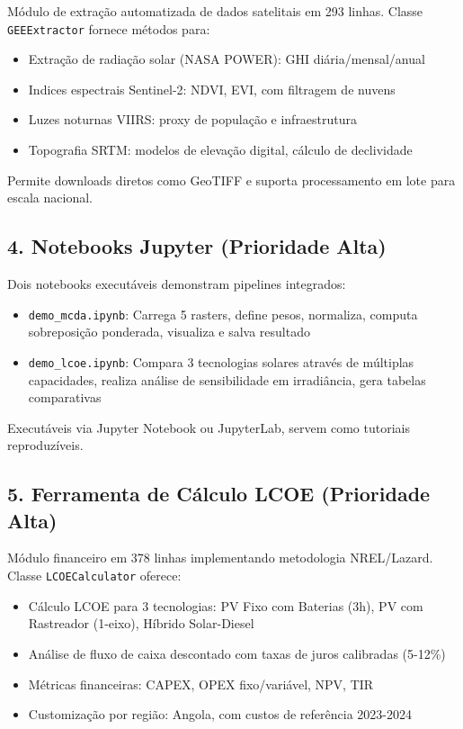 \documentclass[12pt, a4paper]{article}
\begin{document}
Módulo de extração automatizada de dados satelitais em 293 linhas. Classe \texttt{GEEExtractor} fornece métodos para:

\begin{itemize}
    \item Extração de radiação solar (NASA POWER): GHI diária/mensal/anual
    \item Indices espectrais Sentinel-2: NDVI, EVI, com filtragem de nuvens
    \item Luzes noturnas VIIRS: proxy de população e infraestrutura
    \item Topografia SRTM: modelos de elevação digital, cálculo de declividade
\end{itemize}

Permite downloads diretos como GeoTIFF e suporta processamento em lote para escala nacional.

\subsection{4. Notebooks Jupyter (Prioridade Alta)}

Dois notebooks executáveis demonstram pipelines integrados:

\begin{itemize}
    \item \texttt{demo\_mcda.ipynb}: Carrega 5 rasters, define pesos, normaliza, computa sobreposição ponderada, visualiza e salva resultado
    \item \texttt{demo\_lcoe.ipynb}: Compara 3 tecnologias solares através de múltiplas capacidades, realiza análise de sensibilidade em irradiância, gera tabelas comparativas
\end{itemize}

Executáveis via Jupyter Notebook ou JupyterLab, servem como tutoriais reproduzíveis.

\subsection{5. Ferramenta de Cálculo LCOE (Prioridade Alta)}

Módulo financeiro em 378 linhas implementando metodologia NREL/Lazard. Classe \texttt{LCOECalculator} oferece:

\begin{itemize}
    \item Cálculo LCOE para 3 tecnologias: PV Fixo com Baterias (3h), PV com Rastreador (1-eixo), Híbrido Solar-Diesel
    \item Análise de fluxo de caixa descontado com taxas de juros calibradas (5-12\%)
    \item Métricas financeiras: CAPEX, OPEX fixo/variável, NPV, TIR
    \item Customização por região: Angola, com custos de referência 2023-2024
\end{itemize}
\end{document}
